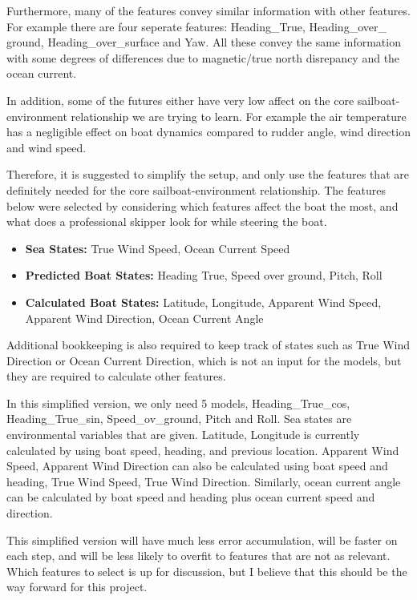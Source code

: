 \documentclass[12pt,twoside]{report}
\begin{document}
Furthermore, many of the features convey similar information with other features. For example there are four seperate features: Heading\_True, Heading\_over\_ ground, Heading\_over\_surface and Yaw. All these convey the same information with some degrees of differences due to magnetic/true north disrepancy and the ocean current. 

In addition, some of the futures either have very low affect on the core sailboat-environment relationship we are trying to learn. For example the air temperature has a negligible effect on boat dynamics compared to rudder angle, wind direction and wind speed.

Therefore, it is suggested to simplify the setup, and only use the features that are definitely needed for the core sailboat-environment relationship. The features below were selected by considering which features affect the boat the most, and what does a professional skipper look for while steering the boat.

\begin{itemize}
    \item \textbf{Sea States:} True Wind Speed, Ocean Current Speed
    \item \textbf{Predicted Boat States:} Heading True, Speed over ground, Pitch, Roll
    \item \textbf{Calculated Boat States:} Latitude, Longitude, Apparent Wind Speed, Apparent Wind Direction, Ocean Current Angle
\end{itemize}

Additional bookkeeping is also required to keep track of states such as True Wind Direction or Ocean Current Direction, which is not an input for the models, but they are required to calculate other features.

In this simplified version, we only need 5 models, Heading\_True\_cos, Heading\_True\_sin, Speed\_ov\_ground, Pitch and Roll. Sea states are environmental variables that are given. Latitude, Longitude is currently calculated by using boat speed, heading, and previous location. Apparent Wind Speed, Apparent Wind Direction can also be calculated using boat speed and heading, True Wind Speed, True Wind Direction. Similarly, ocean current angle can be calculated by boat speed and heading plus ocean current speed and direction.

This simplified version will have much less error accumulation, will be faster on each step, and will be less likely to overfit to features that are not as relevant. Which features to select is up for discussion, but I believe that this should be the way forward for this project.
\end{document}

